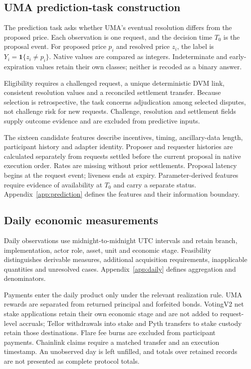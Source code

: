 \subsection{UMA prediction-task construction}
\label{sec:prediction}

The prediction task asks whether UMA's eventual resolution differs from the proposed price. Each observation is one request, and the decision time $T_0$ is the proposal event. For proposed price $p_i$ and resolved price $z_i$, the label is $Y_i=\mathbf{1}\{z_i\ne p_i\}$. Native values are compared as integers. Indeterminate and early-expiration values retain their own classes; neither is recoded as a binary answer.

Eligibility requires a challenged request, a unique deterministic DVM link, consistent resolution values and a reconciled settlement transfer. Because selection is retrospective, the task concerns adjudication among selected disputes, not challenge risk for new requests. Challenge, resolution and settlement fields supply outcome evidence and are excluded from predictive inputs.

The sixteen candidate features describe incentives, timing, ancillary-data length, participant history and adapter identity. Proposer and requester histories are calculated separately from requests settled before the current proposal in native execution order. Rates are missing without prior settlements. Proposal latency begins at the request event; liveness ends at expiry. Parameter-derived features require evidence of availability at $T_0$ and carry a separate status. Appendix~\ref{app:prediction} defines the features and their information boundary.

\subsection{Daily economic measurements}
\label{sec:daily}

Daily observations use midnight-to-midnight UTC intervals and retain branch, implementation, actor role, asset, unit and economic stage. Feasibility distinguishes derivable measures, additional acquisition requirements, inapplicable quantities and unresolved cases. Appendix~\ref{app:daily} defines aggregation and denominators.

Payments enter the daily product only under the relevant realization rule. UMA rewards are separated from returned principal and forfeited bonds. VotingV2 net stake applications retain their own economic stage and are not added to request-level accruals; Tellor withdrawals into stake and Pyth transfers to stake custody retain those destinations. Flare fee burns are excluded from participant payments. Chainlink claims require a matched transfer and an execution timestamp. An unobserved day is left unfilled, and totals over retained records are not presented as complete protocol totals.

